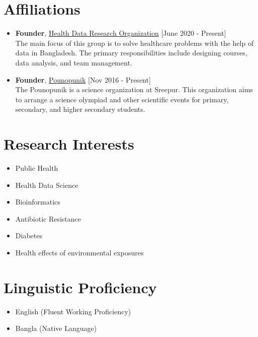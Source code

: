 \documentclass[11pt,a4paper]{moderncv}
\begin{document}
\section{Affiliations}
\begin{itemize}
	\item \textbf{Founder}, 
	\textcolor{blue}{\href{https://hdrobd.org/}{Health Data Research 
	Organization}}
	\hfill [June 2020 - Present]\\ 
	The main focus of this group is to solve healthcare problems with the help 
	of data in Bangladesh. The primary responsibilities include designing 
	courses, data analysis, and team management.
	\item \textbf{Founder}, 
	\textcolor{blue}{\href{}{Pounopunik}}
	\hfill [Nov 2016 - Present]\\
	The Pounopunik is a science organization at Sreepur. This organization aims 
	to arrange a science olympiad and other scientific events for primary, 
	secondary, and higher secondary students. 

\end{itemize}

\section{Research Interests}

\begin{multicols}{2}
	\begin{itemize}
		\item Public Health
		\item Health Data Science
		\item Bioinformatics
	\end{itemize}
	\columnbreak 
	\begin{itemize}
		\item Antibiotic Resistance
		\item Diabetes
		\item Health effects of environmental exposures 
	\end{itemize}

\end{multicols} 

\section{Linguistic Proficiency}
\begin{itemize}  	
	\item English (Fluent Working Proficiency)
	\item Bangla (Native Language)
\end{itemize}
\end{document}

